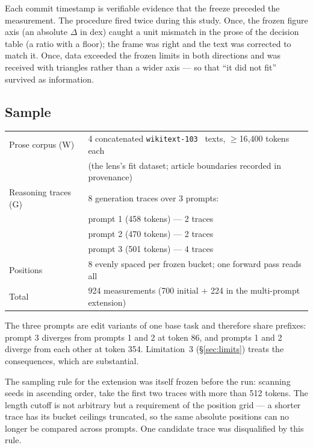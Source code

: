 \documentclass[11pt]{article}
\begin{document}
Each commit timestamp is verifiable evidence that the freeze preceded the
measurement. The procedure fired twice during this study. Once, the
frozen figure axis (an absolute $\Delta$ in dex) caught a unit mismatch
in the prose of the decision table (a ratio with a floor); the frame was
right and the text was corrected to match it. Once, data exceeded the
frozen limits in both directions and was received with triangles rather
than a wider axis --- so that ``it did not fit'' survived as information.

\subsection{Sample}
\label{sec:sample}

\begin{center}
\small
\begin{tabular}{@{}ll@{}}
\toprule
Prose corpus (W) & 4 concatenated \texttt{wikitext-103}~\cite{merity2017wikitext} texts, $\geq$16{,}400 tokens each \\
 & (the lens's fit dataset; article boundaries recorded in provenance) \\
Reasoning traces (G) & 8 generation traces over 3 prompts: \\
 & \quad prompt 1 (458 tokens) --- 2 traces \\
 & \quad prompt 2 (470 tokens) --- 2 traces \\
 & \quad prompt 3 (501 tokens) --- 4 traces \\
Positions & 8 evenly spaced per frozen bucket; one forward pass reads all \\
Total & 924 measurements (700 initial $+$ 224 in the multi-prompt extension) \\
\bottomrule
\end{tabular}
\end{center}

The three prompts are edit variants of one base task and therefore share
prefixes: prompt 3 diverges from prompts 1 and 2 at token 86, and prompts
1 and 2 diverge from each other at token 354. Limitation~3
(\S\ref{sec:limits}) treats the consequences, which are substantial.

The sampling rule for the extension was itself frozen before the run:
scanning seeds in ascending order, take the first two traces with more
than 512 tokens. The length cutoff is not arbitrary but a requirement of
the position grid --- a shorter trace has its bucket ceilings truncated,
so the same absolute positions can no longer be compared across prompts.
One candidate trace was disqualified by this rule.
\end{document}
